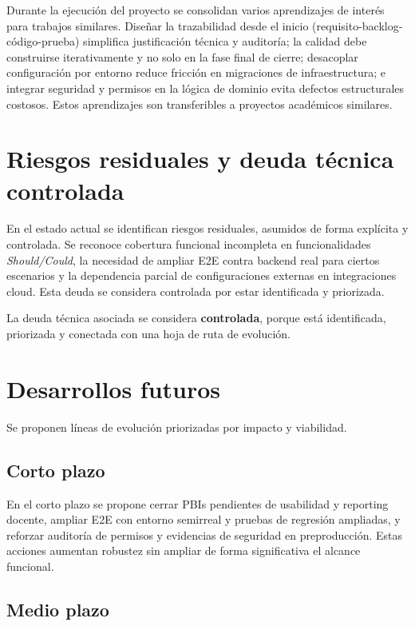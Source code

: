 Durante la ejecuci\'on del proyecto se consolidan varios aprendizajes
de inter\'es para trabajos similares. Dise\~nar la trazabilidad desde el inicio (requisito-backlog-c\'odigo-prueba) simplifica justificaci\'on t\'ecnica y auditor\'ia; la calidad debe construirse iterativamente y no solo en la fase final de cierre; desacoplar configuraci\'on por entorno reduce fricci\'on en migraciones de infraestructura; e integrar seguridad y permisos en la l\'ogica de dominio evita defectos estructurales costosos. Estos aprendizajes son transferibles a proyectos acad\'emicos similares.

\FloatBarrier
\section{Riesgos residuales y deuda t\'ecnica controlada}

En el estado actual se identifican riesgos residuales,
asumidos de forma expl\'icita y controlada. Se reconoce cobertura funcional incompleta en funcionalidades \emph{Should/Could}, la necesidad de ampliar E2E contra backend real para ciertos escenarios y la dependencia parcial de configuraciones externas en integraciones cloud. Esta deuda se considera controlada por estar identificada y priorizada.

La deuda t\'ecnica asociada se considera \textbf{controlada},
porque est\'a identificada,
priorizada y conectada con una hoja de ruta de evoluci\'on.

\FloatBarrier
\section{Desarrollos futuros}

Se proponen l\'ineas de evoluci\'on priorizadas por impacto y viabilidad.

\subsection{Corto plazo}

En el corto plazo se propone cerrar PBIs pendientes de usabilidad y reporting docente, ampliar E2E con entorno semirreal y pruebas de regresi\'on ampliadas, y reforzar auditor\'ia de permisos y evidencias de seguridad en preproducci\'on. Estas acciones aumentan robustez sin ampliar de forma significativa el alcance funcional.

\subsection{Medio plazo}

